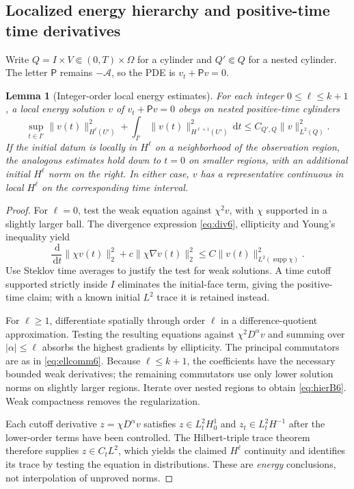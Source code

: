 \documentclass[11pt,a4paper]{article}
\newtheorem{lemma}[theorem]{Lemma}
\theoremstyle{definition}\newtheorem{definition}{Definition}[section]\newtheorem{example}[theorem]{Example}
\theoremstyle{remark}\newtheorem{remark}[theorem]{Remark}\newtheorem{remarkSix}{Remark}[section]
\newcommand{\dd}{\,\mathrm d}
\newcommand{\norm}[1]{\lVert #1\rVert}
\newcommand{\supp}{\operatorname{supp}}
\newcommand{\cA}{\mathcal A}
\begin{document}
\subsection{Localized energy hierarchy and positive-time time derivatives}
\label{subsec:energyB}
Write $Q=I\times V\Subset(0,T)\times\Omega$ for a cylinder and $Q'\Subset Q$ for a nested cylinder. The letter $\mathsf P$ remains $-\cA$, so the PDE is $v_t+\mathsf Pv=0$.

\begin{lemma}[Integer-order local energy estimates]\label{lem:energyhier6}
For each integer $0\le\ell\le k+1$, a local energy solution $v$ of $v_t+\mathsf Pv=0$ obeys on nested positive-time cylinders
\begin{equation}\label{eq:hierB6}
 \sup_{t\in I'}\norm{v(t)}_{H^\ell(U')}^2
 +\int_{I'}\norm{v(t)}_{H^{\ell+1}(U')}^2\dd t
 \le C_{Q',Q}\norm v_{L^2(Q)}^2.
\end{equation}
If the initial datum is locally in $H^\ell$ on a neighborhood of the observation region, the analogous estimates hold down to $t=0$ on smaller regions, with an additional initial $H^\ell$ norm on the right. In either case, $v$ has a representative continuous in local $H^\ell$ on the corresponding time interval.
\end{lemma}
\begin{proof}
For $\ell=0$, test the weak equation against $\chi^2v$, with $\chi$ supported in a slightly larger ball. The divergence expression \eqref{eq:div6}, ellipticity and Young's inequality yield
\begin{equation}\label{eq:baseenergyB6}
 \frac{\dd}{\dd t}\norm{\chi v(t)}_2^2
 +c\norm{\chi\nabla v(t)}_2^2
 \le C\norm{v(t)}_{L^2(\supp\chi)}^2.
\end{equation}
Use Steklov time averages to justify the test for weak solutions. A time cutoff supported strictly inside $I$ eliminates the initial-face term, giving the positive-time claim; with a known initial $L^2$ trace it is retained instead.

For $\ell\ge1$, differentiate spatially through order $\ell$ in a difference-quotient approximation. Testing the resulting equations against $\chi^2D^\alpha v$ and summing over $|\alpha|\le\ell$ absorbs the highest gradients by ellipticity. The principal commutators are as in \eqref{eq:ellcomm6}. Because $\ell\le k+1$, the coefficients have the necessary bounded weak derivatives; the remaining commutators use only lower solution norms on slightly larger regions. Iterate over nested regions to obtain \eqref{eq:hierB6}. Weak compactness removes the regularization.

Each cutoff derivative $z=\chi D^\alpha v$ satisfies $z\in L^2_tH^1_0$ and $z_t\in L^2_tH^{-1}$ after the lower-order terms have been controlled. The Hilbert-triple trace theorem therefore supplies $z\in C_tL^2$, which yields the claimed $H^\ell$ continuity and identifies its trace by testing the equation in distributions. These are \emph{energy} conclusions, not interpolation of unproved norms.
\end{proof}
\end{document}
